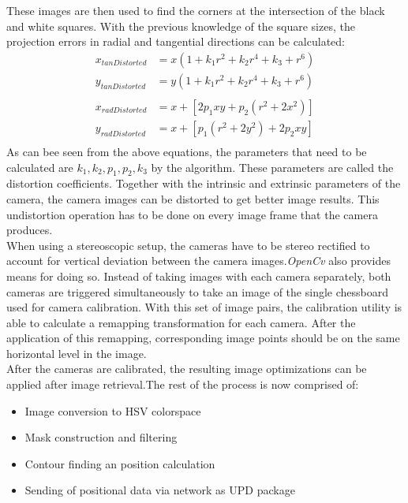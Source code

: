 These images are then used to find the corners at the intersection of the black and white squares. With the previous knowledge of the square sizes, the projection errors in radial and tangential directions can be calculated:
\begin{equation}
\begin{split}
x_{tanDistorted}&=x(1+k_{1}r^{2}+k_{2}r^{4}+k_{3}+r^{6})\\
y_{tanDistorted}&=y(1+k_{1}r^{2}+k_{2}r^{4}+k_{3}+r^{6})\\
\\
x_{radDistorted}&=x+[2p_{1}xy+p_{2}(r^{2}+2x^{2})]\\
y_{radDistorted}&=x+[p_{1}(r^{2}+2y^{2})+2p_{2}xy]\\
\end{split}
\end{equation} 
As can bee seen from the above equations, the parameters that need to be calculated are $k_{1},k_{2},p_{1},p_{2},k_{3}$ by the algorithm. These parameters are called the distortion coefficients. Together with the intrinsic and extrinsic parameters of the camera, the camera images can be distorted to get better image results. This undistortion operation has to be done on every image frame that the camera produces.\\
When using a stereoscopic setup, the cameras have to be stereo rectified to account for vertical deviation between the camera images.\textit{OpenCv} also provides means for doing so. Instead of taking images with each camera separately, both cameras are triggered simultaneously to take an image of the single chessboard used for camera calibration. With this set of image pairs, the calibration utility is able to calculate a remapping transformation for each camera. After the application of this remapping, corresponding image points should be on the same horizontal level in the image.\\After the cameras are calibrated, the resulting image optimizations can be applied after image retrieval.The rest of the process is now comprised of:
\begin{itemize}
\item Image conversion to HSV colorspace
\item Mask construction and filtering
\item Contour finding an position calculation
\item Sending of positional data via network as UPD package
\end{itemize}
